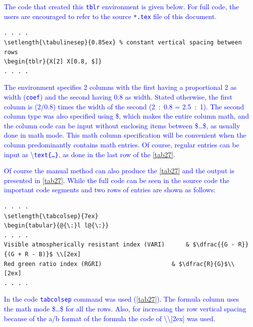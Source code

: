 \documentclass[phd]{ndsu-thesis-2022}
\newcommand\italk[1]{\textcolor{blue}{#1}}  %
\newcommand\cmd[1]{\textbackslash\texttt{#1}}  %
\newcommand\vb[1]{\textcolor{blue}{\texttt{#1}}}%
\begin{document}
\italk{The code that created this \vb{tblr} environment is given below. For full code, the users are encouraged to refer to the source \vb{*.tex} file of this document.}

\vspace{-1ex}
{\singlespacing
\begin{verbatim}
. . . . 
\setlength{\tabulinesep}{0.85ex} % constant vertical spacing between rows
\begin{tblr}{X[2] X[0.8, $]}
. . . . 
\end{verbatim}
}

\vspace{-2ex}
\italk{The environment specifies 2 columns with the first having a proportional 2 as width (\vb{coef}) and the second having 0.8 as width. Stated otherwise, the first column is \fpeval{2/0.8} (2/0.8) times the width of the second (2~:~0.8 = 2.5~:~1). The second column type was also specified using \$, which makes the entire column math, and the column code can be input without enclosing items between \$\ldots\$, as usually done in math mode. This math column specification will be convenient when the column predominantly contains math entries. Of course, regular entries can be input as \cmd{text\{\ldots\}}, as done in the last row of the \cref{tab27}.
}

\italk{Of course the manual method can also produce the \cref{tab27} and the output is presented in \cref{tab27}.  While the full code can be seen in the source code the important code segments and two rows of entries are shown as follows:
}

{\singlespacing
\begin{verbatim}
. . . . 
\setlength{\tabcolsep}{7ex}
\begin{tabular}{@{\:}l l@{\:}}
. . . . 
Visible atmospherically resistant index (VARI) 		& $\dfrac{{G - R}}
{(G + R - B)}$ \\[2ex]
Red green ratio index (RGRI) 					& $\dfrac{R}{G}$\\[2ex]
. . . . 
\end{verbatim}
}

\vspace{-2ex}
\italk{In the code \vb{tabcolsep} command was used (\cref{tab27}). The formula column uses the math mode \$\ldots\$ for all the rows. Also, for increasing the row vertical spacing because of the a/b format of the formula the code of \textbackslash\textbackslash[2ex] was used.}
\end{document}
